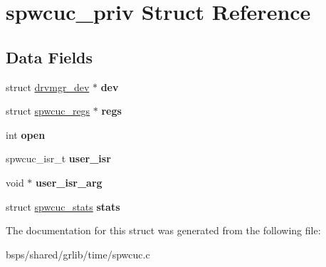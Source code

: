 \hypertarget{structspwcuc__priv}{}\section{spwcuc\+\_\+priv Struct Reference}
\label{structspwcuc__priv}
\subsection*{Data Fields}
\begin{DoxyCompactItemize}
\item 
\mbox{\label{structspwcuc__priv_aa610bbed6f3bc474b63ad741bfea2b25}} 
struct \mbox{\hyperlink{structdrvmgr__dev}{drvmgr\+\_\+dev}} $\ast$ {\bfseries dev}
\item 
\mbox{\label{structspwcuc__priv_a43df86f43c2c98ab986c8b6e4f4d23d9}} 
struct \mbox{\hyperlink{structspwcuc__regs}{spwcuc\+\_\+regs}} $\ast$ {\bfseries regs}
\item 
\mbox{\label{structspwcuc__priv_a65f2914cc18aa664a456d9df42037f4f}} 
int {\bfseries open}
\item 
\mbox{\label{structspwcuc__priv_af15c8d60fd21e31aeebdfc40e1de9817}} 
spwcuc\+\_\+isr\+\_\+t {\bfseries user\+\_\+isr}
\item 
\mbox{\label{structspwcuc__priv_a7ac56fa678b1d53c4d8a64bc349b4606}} 
void $\ast$ {\bfseries user\+\_\+isr\+\_\+arg}
\item 
\mbox{\label{structspwcuc__priv_a40eddeacd7a196c7f01cd267d54c6df5}} 
struct \mbox{\hyperlink{structspwcuc__stats}{spwcuc\+\_\+stats}} {\bfseries stats}
\end{DoxyCompactItemize}


The documentation for this struct was generated from the following file\+:\begin{DoxyCompactItemize}
\item 
bsps/shared/grlib/time/spwcuc.\+c\end{DoxyCompactItemize}

